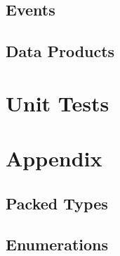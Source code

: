 

\subsection{Events}



\subsection{Data Products}


\section{Unit Tests}



\section{Appendix}
\subsection{Packed Types}



\subsection{Enumerations}




